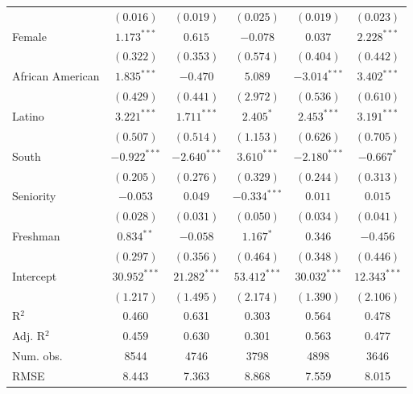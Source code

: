 \documentclass[12pt]{article}
\begin{document}
\begin{table}[H]
\begin{threeparttable}
\begin{tabular}{l c c c c c }
& $(0.016)$      & $(0.019)$      & $(0.025)$      & $(0.019)$      & $(0.023)$      \\
Female                 & $1.173^{***}$  & $0.615$        & $-0.078$       & $0.037$        & $2.228^{***}$  \\
& $(0.322)$      & $(0.353)$      & $(0.574)$      & $(0.404)$      & $(0.442)$      \\
African American                   & $1.835^{***}$  & $-0.470$       & $5.089$        & $-3.014^{***}$ & $3.402^{***}$  \\
& $(0.429)$      & $(0.441)$      & $(2.972)$      & $(0.536)$      & $(0.610)$      \\
Latino                 & $3.221^{***}$  & $1.711^{***}$  & $2.405^{*}$    & $2.453^{***}$  & $3.191^{***}$  \\
& $(0.507)$      & $(0.514)$      & $(1.153)$      & $(0.626)$      & $(0.705)$      \\
South                  & $-0.922^{***}$ & $-2.640^{***}$ & $3.610^{***}$  & $-2.180^{***}$ & $-0.667^{*}$   \\
& $(0.205)$      & $(0.276)$      & $(0.329)$      & $(0.244)$      & $(0.313)$      \\
Seniority              & $-0.053$       & $0.049$        & $-0.334^{***}$ & $0.011$        & $0.015$        \\
& $(0.028)$      & $(0.031)$      & $(0.050)$      & $(0.034)$      & $(0.041)$      \\
Freshman               & $0.834^{**}$   & $-0.058$       & $1.167^{*}$    & $0.346$        & $-0.456$       \\
& $(0.297)$      & $(0.356)$      & $(0.464)$      & $(0.348)$      & $(0.446)$      \\
Intercept            & $30.952^{***}$ & $21.282^{***}$ & $53.412^{***}$ & $30.032^{***}$ & $12.343^{***}$ \\
& $(1.217)$      & $(1.495)$      & $(2.174)$      & $(1.390)$      & $(2.106)$      \\
\hline
R$^2$                  & 0.460          & 0.631          & 0.303          & 0.564          & 0.478          \\
Adj. R$^2$             & 0.459          & 0.630          & 0.301          & 0.563          & 0.477          \\
Num. obs.              & 8544           & 4746           & 3798           & 4898           & 3646           \\
RMSE                   & 8.443          & 7.363          & 8.868          & 7.559          & 8.015          \\

\end{tabular}
\end{threeparttable}
\end{table}
\end{document}
